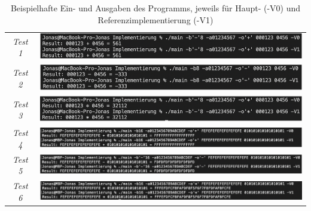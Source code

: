 \documentclass[course=erap]{aspdoc}
\begin{document}
    \begin{table}[h]
        \centering
        \begin{tabular}{cc}
            \toprule
            \textit{Test 1} & \includegraphics[width=12cm]{Abbildungen/Eingabe1.png} \\
            \textit{Test 2} & \includegraphics[width=12cm]{Abbildungen/Eingabe2.png} \\
            \textit{Test 3} & \includegraphics[width=12cm]{Abbildungen/Eingabe3.png} \\
            \textit{Test 4} & \includegraphics[width=12cm]{Abbildungen/Eingabe4.png} \\
            \textit{Test 5} & \includegraphics[width=12cm]{Abbildungen/Eingabe5.png} \\
            \textit{Test 6} & \includegraphics[width=12cm]{Abbildungen/Eingabe6.png} \\
            \bottomrule
        \end{tabular}
        \caption{Beispielhafte Ein- und Ausgaben des Programms, jeweils für Haupt- (-V0) und Referenzimplementierung (-V1)}\label{tab:Tests}
    \end{table}
\end{document}
